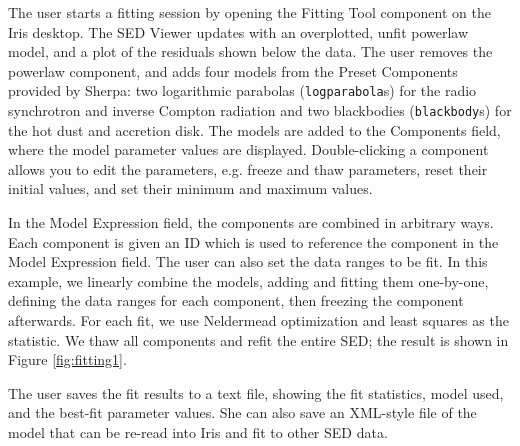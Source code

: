 \documentclass[5p]{elsarticle}
\begin{document}
The user starts a fitting session by opening the Fitting Tool component on the Iris desktop. The SED Viewer updates with an overplotted, unfit powerlaw model, and a plot of the residuals shown below the data. The user removes the powerlaw component, and adds four models from the Preset Components provided by Sherpa: two logarithmic parabolas (\texttt{logparabola}s) for the radio synchrotron and inverse Compton radiation and two blackbodies (\texttt{blackbody}s) for the hot dust and accretion disk. The models are added to the Components field, where the model parameter values are displayed. Double-clicking a component allows you to edit the parameters, e.g. freeze and thaw parameters, reset their initial values, and set their minimum and maximum values. 

In the Model Expression field, the components are combined in arbitrary ways. Each component is given an ID which is used to reference the component in the Model Expression field. The user can also set the data ranges to be fit. In this example, we linearly combine the models, adding and fitting them one-by-one, defining the data ranges for each component, then freezing the component afterwards. For each fit, we use Neldermead optimization and least squares as the statistic. We thaw all components and refit the entire SED; the result is shown in Figure \ref{fig:fitting1}. 

The user saves the fit results to a text file, showing the fit statistics, model used, and the best-fit parameter values. She can also save an XML-style file of the model that can be re-read into Iris and fit to other SED data.
\end{document}
